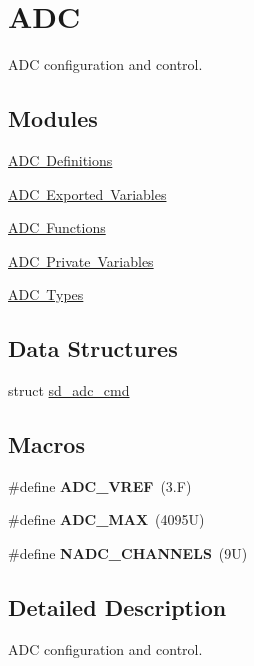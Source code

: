 \hypertarget{group___s_d___a_d_c}{}\section{A\+DC}
\label{group___s_d___a_d_c}


A\+DC configuration and control.  


\subsection*{Modules}
\begin{DoxyCompactItemize}
\item 
\mbox{\hyperlink{group___s_d___a_d_c___defines}{A\+D\+C Definitions}}
\item 
\mbox{\hyperlink{group___s_d___a_d_c___exported___variables}{A\+D\+C Exported Variables}}
\item 
\mbox{\hyperlink{group___s_d___a_d_c___functions}{A\+D\+C Functions}}
\item 
\mbox{\hyperlink{group___s_d___a_d_c___private___variables}{A\+D\+C Private Variables}}
\item 
\mbox{\hyperlink{group___s_d___a_d_c___types}{A\+D\+C Types}}
\end{DoxyCompactItemize}
\subsection*{Data Structures}
\begin{DoxyCompactItemize}
\item 
struct \mbox{\hyperlink{structsd__adc__cmd}{sd\+\_\+adc\+\_\+cmd}}
\end{DoxyCompactItemize}
\subsection*{Macros}
\begin{DoxyCompactItemize}
\item 
\mbox{\label{group___s_d___a_d_c_ga5a03d0b939a8dda552c9fe3319a82485}} 
\#define {\bfseries A\+D\+C\+\_\+\+V\+R\+EF}~(3.\+F)
\item 
\mbox{\label{group___s_d___a_d_c_ga555a695bf58df062dc03f0e892d95cd7}} 
\#define {\bfseries A\+D\+C\+\_\+\+M\+AX}~(4095\+U)
\item 
\mbox{\label{group___s_d___a_d_c_ga47f89b3f3e21c9b9f52690ab89cf59cc}} 
\#define {\bfseries N\+A\+D\+C\+\_\+\+C\+H\+A\+N\+N\+E\+LS}~(9\+U)
\end{DoxyCompactItemize}


\subsection{Detailed Description}
A\+DC configuration and control. 

